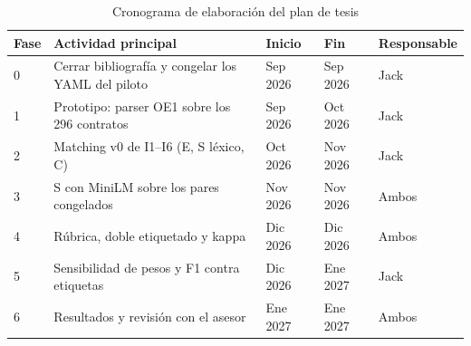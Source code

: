 \begin{table}[H]
  \centering
  \caption{Cronograma de elaboración del plan de tesis}
  \label{tab:cronograma}
  \small
  \begin{tabular}{@{}p{}p{}p{}p{}p{}@{}}
    \toprule
    \textbf{Fase} & \textbf{Actividad principal} & \textbf{Inicio} & \textbf{Fin} & \textbf{Responsable} \\
    \midrule
    0 & Cerrar bibliografía y congelar los YAML del piloto & Sep 2026 & Sep 2026 & Jack \\
    1 & Prototipo: parser OE1 sobre los 296 contratos & Sep 2026 & Oct 2026 & Jack \\
    2 & Matching v0 de I1--I6 (E, S léxico, C) & Oct 2026 & Nov 2026 & Jack \\
    3 & S con MiniLM sobre los pares congelados & Nov 2026 & Nov 2026 & Ambos \\
    4 & Rúbrica, doble etiquetado y kappa & Dic 2026 & Dic 2026 & Ambos \\
    5 & Sensibilidad de pesos y F1 contra etiquetas & Dic 2026 & Ene 2027 & Jack \\
    6 & Resultados y revisión con el asesor & Ene 2027 & Ene 2027 & Ambos \\
    \bottomrule
  \end{tabular}
\end{table}
